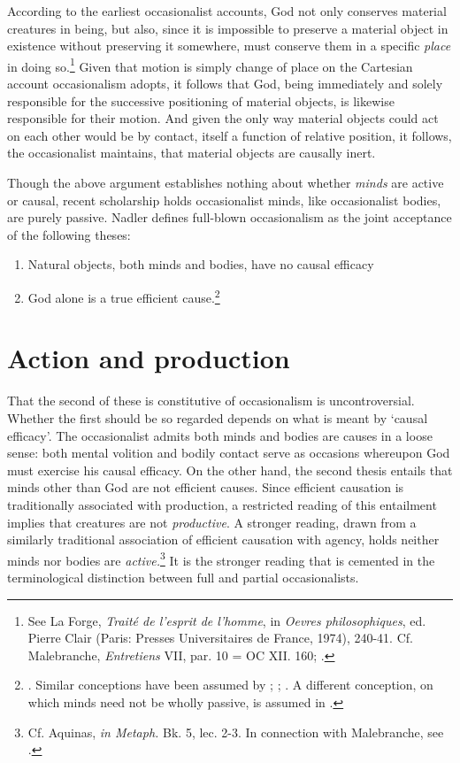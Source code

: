 According to the earliest occasionalist accounts, God not only conserves material creatures in being, but also, since it is impossible to preserve a material object in existence without preserving it somewhere, must conserve them in a specific \emph{place} in doing so.\footnote{See La Forge, \emph{Traité de l'esprit de l'homme}, in \emph{Oevres philosophiques}, ed. Pierre Clair (Paris: Presses Universitaires de France, 1974), 240-41. Cf. Malebranche, \emph{Entretiens} VII, par. 10 = OC XII. 160; \autocite{Nadler1998}.} Given that motion is simply change of place on the Cartesian account occasionalism adopts, it follows that God, being immediately and solely responsible for the successive positioning of material objects, is likewise responsible for their motion. And given the only way material objects could act on each other would be by contact, itself a function of relative position, it follows, the occasionalist maintains, that material objects are causally inert.

Though the above argument establishes nothing about whether \emph{minds} are active or causal, recent scholarship holds occasionalist minds, like occasionalist bodies, are purely passive. Nadler defines full-blown occasionalism as the joint acceptance of the following theses:

\begin{enumerate}
	\item Natural objects, both minds and bodies, have no causal efficacy
	\item God alone is a true efficient cause.\footnote{\autocite[39]{Nadler2005}. Similar conceptions have been assumed by \autocite[45-46]{Pyle2003}; \autocite[174]{Battail1973}; \autocite[288]{Winkler2011}. A different conception, on which minds need not be wholly passive, is assumed in \autocite[358]{Radner1993}.}
\end{enumerate}

\section{Action and production}
That the second of these is constitutive of occasionalism is uncontroversial. Whether the first should be so regarded depends on what is meant by `causal efficacy'. The occasionalist admits both minds and bodies are causes in a loose sense: both mental volition and bodily contact serve as occasions whereupon God must exercise his causal efficacy. On the other hand, the second thesis entails that minds other than God are not efficient causes. Since efficient causation is traditionally associated with production, a restricted reading of this entailment implies that creatures are not \emph{productive}. A stronger reading, drawn from a similarly traditional association of efficient causation with agency, holds neither minds nor bodies are \emph{active.}\footnote{Cf. Aquinas, \emph{in Metaph.} Bk. 5, lec. 2-3. In connection with Malebranche, see \autocite[255-256]{Baker2005}.} It is the stronger reading that is cemented in the terminological distinction between full and partial occasionalists. 

